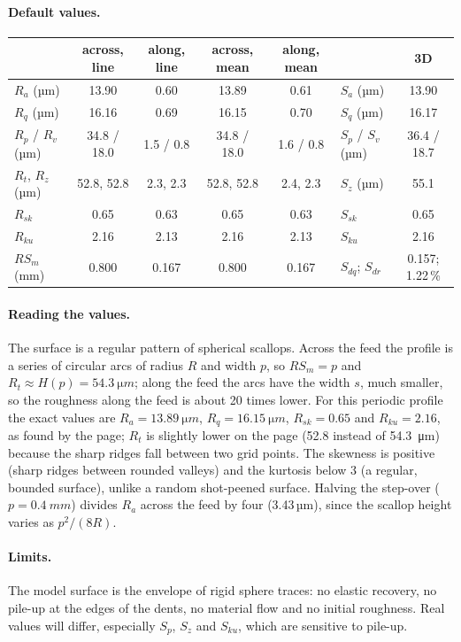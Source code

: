 \documentclass[11pt,a4paper]{article}
\begin{document}
\paragraph{Default values.}
\begin{center}\small
\begin{tabular}{@{}lcccc@{\qquad}lc@{}}
\toprule
 & across, line & along, line & across, mean & along, mean & & 3D\\ \midrule
$R_a$ (µm) & 13.90 & 0.60 & 13.89 & 0.61 & $S_a$ (µm) & 13.90\\
$R_q$ (µm) & 16.16 & 0.69 & 16.15 & 0.70 & $S_q$ (µm) & 16.17\\
$R_p$ / $R_v$ (µm) & 34.8 / 18.0 & 1.5 / 0.8 & 34.8 / 18.0 & 1.6 / 0.8 & $S_p$ / $S_v$ (µm) & 36.4 / 18.7\\
$R_t$, $R_z$ (µm) & 52.8, 52.8 & 2.3, 2.3 & 52.8, 52.8 & 2.4, 2.3 & $S_z$ (µm) & 55.1\\
$R_{sk}$ & 0.65 & 0.63 & 0.65 & 0.63 & $S_{sk}$ & 0.65\\
$R_{ku}$ & 2.16 & 2.13 & 2.16 & 2.13 & $S_{ku}$ & 2.16\\
$RS_m$ (mm) & 0.800 & 0.167 & 0.800 & 0.167 & $S_{dq}$; $S_{dr}$ & 0.157; 1.22\,\%\\ \bottomrule
\end{tabular}
\end{center}

\paragraph{Reading the values.} The surface is a regular pattern of spherical scallops. Across the feed the profile is a series of circular arcs of radius $R$ and width $p$, so $RS_m=p$ and $R_t\approx H(p)=\SI{54.3}{\micro m}$; along the feed the arcs have the width $s$, much smaller, so the roughness along the feed is about 20 times lower. For this periodic profile the exact values are $R_a=\SI{13.89}{\micro m}$, $R_q=\SI{16.15}{\micro m}$, $R_{sk}=0.65$ and $R_{ku}=2.16$, as found by the page; $R_t$ is slightly lower on the page (52.8 instead of \SI{54.3}{\micro m}) because the sharp ridges fall between two grid points. The skewness is positive (sharp ridges between rounded valleys) and the kurtosis below 3 (a regular, bounded surface), unlike a random shot-peened surface. Halving the step-over ($p=\SI{0.4}{mm}$) divides $R_a$ across the feed by four (3.43\,µm), since the scallop height varies as $p^2/(8R)$.

\paragraph{Limits.} The model surface is the envelope of rigid sphere traces: no elastic recovery, no pile-up at the edges of the dents, no material flow and no initial roughness. Real values will differ, especially $S_p$, $S_z$ and $S_{ku}$, which are sensitive to pile-up.
\end{document}
